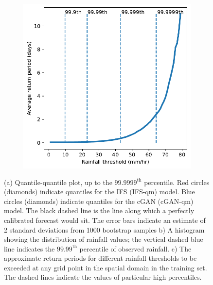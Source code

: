 \documentclass{article}
\begin{document}
\begin{figure}[!ht]
\begin{subfigure}[h]{0.5\textwidth}
         \caption{}
        \centering
    \end{subfigure}
    \begin{subfigure}{0.48\textwidth}
     \includegraphics[width=\textwidth]{images/return_periods_train.pdf}
     \caption{}
     \end{subfigure}
     \centering
     \caption{(a) Quantile-quantile plot, up to the $99.9999^{\text{th}}$ percentile. Red circles (diamonds) indicate quantiles for the IFS (IFS-qm) model. Blue circles (diamonds) indicate quantiles for the cGAN (cGAN-qm) model. The black dashed line is the line along which a perfectly calibrated forecast would sit. The error bars indicate an estimate of 2 standard deviations from 1000 bootstrap samples b) A histogram showing the distribution of rainfall values; the vertical dashed blue line indicates the $99.99^{\text{th}}$ percentile of observed rainfall. c) The approximate return periods for different rainfall thresholds to be exceeded at any grid point in the spatial domain in the training set. The dashed lines indicate the values of particular high percentiles. }
     \label{fig:distribution}
\end{figure}
\end{document}
